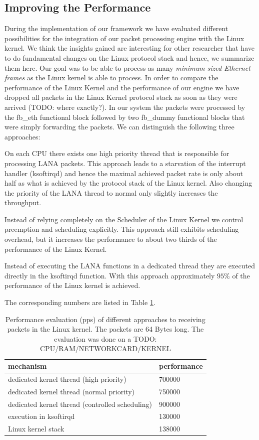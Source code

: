 \documentclass{sig-alternate}
\begin{document}
\subsection{Improving the Performance}
During the implementation of our framework we have evaluated different possibilities for the integration of our packet processing engine with the Linux kernel. We think the insights gained are interesting for other researcher that have to do fundamental changes on the Linux protocol stack and hence, we summarize them here. 
Our goal was to be able to process as many \textit{minimum sized Ethernet frames} as the Linux kernel is able to process. In order to compare the performance of the Linux Kernel and the performance of our engine we have dropped all packets in the Linux Kernel protocol stack as soon as they were arrived (TODO: where exactly?). In our system the packets were processed by the fb\_eth functional block followed by two fb\_dummy functional blocks that were simply forwarding the packets. We can distinguish the following three approaches:
\begin{compactitem}
\item On each CPU there exists one high priority thread that is responsible for processing LANA packets. This approach leads to a starvation of the interrupt handler (ksoftirqd) and hence the maximal achieved packet rate is only about half as what is achieved by the protocol stack of the Linux kernel. Also changing the priority of the LANA thread to normal only slightly increases the throughput.
\item Instead of relying completely on the Scheduler of the Linux Kernel we control preemption and scheduling explicitly. This approach still exhibits scheduling overhead, but it increases the performance to about two thirds of the performance of the Linux Kernel. 
\item Instead of executing the LANA functions in a dedicated thread they are executed directly in the ksoftirqd function. With this approach approximately $95\%$ of the performance of the Linux kernel is achieved.
\end{compactitem}
The corresponding numbers are listed in Table \ref{tab:performance}.

\begin{table}[htb]
\begin{tabular}{ l l }
mechanism & performance\\
\hline
dedicated kernel thread (high priority) & 700000\\
dedicated kernel thread (normal priority) & 750000\\
dedicated kernel thread (controlled scheduling) & 900000\\
execution in ksoftirqd & 130000\\
Linux kernel stack & 138000\\
\end{tabular}
\caption{Performance evaluation (pps) of different approaches to receiving packets in the Linux kernel. The packets are 64 Bytes long. The evaluation was done on a TODO: CPU/RAM/NETWORKCARD/KERNEL}
\label{tab:performance}
\end{table}	
\end{document}
